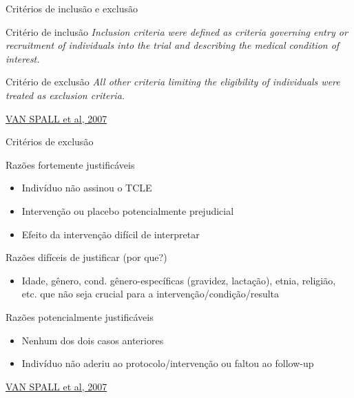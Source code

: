 \documentclass{beamer}
\begin{document}
\begin{frame}{Critérios de inclusão e exclusão}
  \begin{block}{Critério de inclusão}
    {\em Inclusion criteria were defined as criteria governing entry or
    recruitment of individuals into the trial and describing the
    medical condition of interest.}
  \end{block}
  \begin{block}{Critério de exclusão}
    {\em All other criteria limiting the eligibility of individuals were
    treated as exclusion criteria.}
  \end{block}

  \vfill
  \scriptsize
  \hfill \href{https://doi.org/10.1001/jama.297.11.1233}{VAN SPALL et al, 2007}
\end{frame}

\begin{frame}{Critérios de exclusão}
  \begin{block}{Razões fortemente justificáveis}
    \small
    \begin{itemize}
    \item Indivíduo não assinou o TCLE
    \item Intervenção ou placebo potencialmente prejudicial
    \item Efeito da intervenção difícil de interpretar
    \end{itemize}
  \end{block}
  \pause
  \begin{block}{Razões difíceis de justificar (por que?)}
    \small
    \begin{itemize}
    \item Idade, gênero, cond. gênero-específicas (gravidez, lactação), etnia, religião, etc. que não seja crucial para a intervenção/condição/resulta
    \end{itemize}
  \end{block}
  \pause
  \begin{block}{Razões potencialmente justificáveis}
    \small
    \begin{itemize}
    \item Nenhum dos dois casos anteriores
    \item Indivíduo não aderiu ao protocolo/intervenção ou faltou ao follow-up
    \end{itemize}
  \end{block}

  \vfill
  \scriptsize
  \hfill \href{https://doi.org/10.1001/jama.297.11.1233}{VAN SPALL et al, 2007}
\end{frame}
\end{document}
